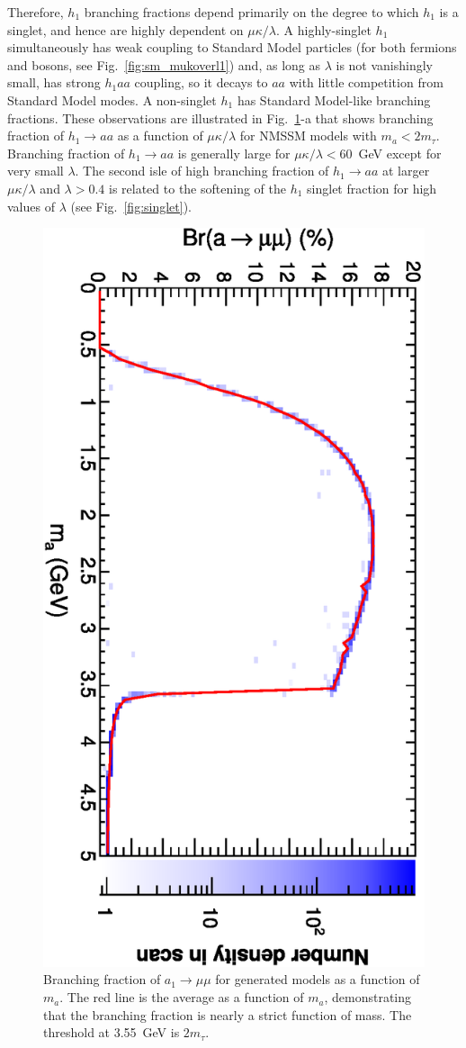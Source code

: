 \documentclass[aps,prl,twocolumn,nofootinbib,superscriptaddress]{revtex4}
\begin{document}
Therefore, $h_1$ branching fractions depend primarily on the degree to which
$h_1$ is a singlet, and hence are highly dependent on $\mu\kappa/\lambda$.  
A highly-singlet $h_1$ simultaneously has weak coupling to Standard Model 
particles (for both fermions and bosons, see Fig.~\ref{fig:sm_mukoverl1}) and, 
as long as $\lambda$ is not vanishingly small, has strong $h_1 aa$ coupling, 
so it decays to $aa$ with little competition from Standard Model modes. A 
non-singlet $h_1$ has Standard Model-like branching fractions. These observations
are illustrated in Fig.~\ref{fig:brhaa}-a that shows branching fraction of $h_1 \to aa$ 
as a function of $\mu\kappa/\lambda$ for NMSSM models with $m_a < 2m_\tau$. Branching 
fraction of $h_1 \to aa$ is generally large for $\mu\kappa/\lambda < 60$~GeV except
for very small $\lambda$.  The second isle of high branching fraction of $h_1 \to aa$
at larger $\mu\kappa/\lambda$ and $\lambda > 0.4$ is related to the softening of the 
$h_1$ singlet fraction for high values of $\lambda$ (see Fig.~\ref{fig:singlet}).

\begin{figure}
\centering
\includegraphics[height=0.75\linewidth, angle=90]{plots/newbranching/bra_vs_ma.eps}
\caption{Branching fraction of $a_1 \to \mu \mu$ for
  generated models as a function of $m_a$.  The red line is the average as a function of
  $m_a$, demonstrating that the branching fraction is nearly a strict
  function of mass.  The threshold at 3.55~GeV is $2m_\tau$.  
\label{fig:brhaa}}
\end{figure}
\end{document}

